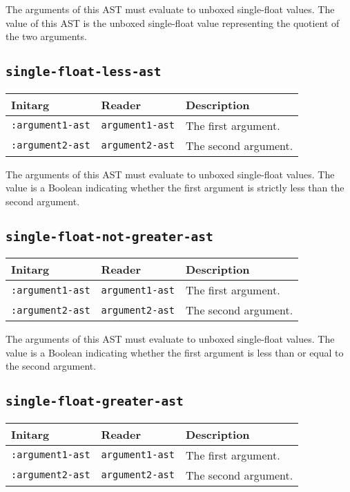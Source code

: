 The arguments of this AST must evaluate to unboxed single-float
values.  The value of this AST is the unboxed single-float value
representing the quotient of the two arguments.

\subsection{\texttt{single-float-less-ast}}
\label{sec-ast-single-float-less}

\begin{tabular}{|l|l|l|}
\hline
Initarg & Reader & Description\\
\hline\hline
\texttt{:argument1-ast} & \texttt{argument1-ast} & The first argument.\\
\hline
\texttt{:argument2-ast} & \texttt{argument2-ast} & The second argument.\\
\hline
\end{tabular}

The arguments of this AST must evaluate to unboxed single-float
values.  The value is a Boolean indicating whether the first argument
is strictly less than the second argument.

\subsection{\texttt{single-float-not-greater-ast}}
\label{sec-ast-single-float-not-greater}

\begin{tabular}{|l|l|l|}
\hline
Initarg & Reader & Description\\
\hline\hline
\texttt{:argument1-ast} & \texttt{argument1-ast} & The first argument.\\
\hline
\texttt{:argument2-ast} & \texttt{argument2-ast} & The second argument.\\
\hline
\end{tabular}

The arguments of this AST must evaluate to unboxed single-float
values.  The value is a Boolean indicating whether the first argument
is less than or equal to the second argument.

\subsection{\texttt{single-float-greater-ast}}
\label{sec-ast-single-float-greater}

\begin{tabular}{|l|l|l|}
\hline
Initarg & Reader & Description\\
\hline\hline
\texttt{:argument1-ast} & \texttt{argument1-ast} & The first argument.\\
\hline
\texttt{:argument2-ast} & \texttt{argument2-ast} & The second argument.\\
\hline
\end{tabular}

